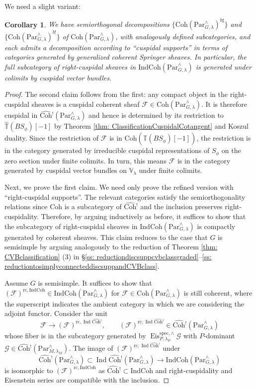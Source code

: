 \documentclass{amsart}
\newtheorem{corollary}[theorem]{Corollary}
\theoremstyle{definition}
\theoremstyle{remark}
\numberwithin{equation}{section}
\DeclareMathOperator{\Ind}{Ind}
\newcommand{\mc}{\mathcal}
\newcommand{\spec}{\mathrm{spec}}
\newcommand{\wh}{\widehat}
\newcommand{\Par}{\mathrm{Par}}
\newcommand{\IndCoh}{\mathrm{IndCoh}}
\DeclareMathOperator{\Eis}{\mathrm{Eis}}
\newcommand{\Coh}{\mathrm{Coh}}
\newcommand{\rc}{\mathrm{rc}}
\newcommand{\V}{\mathbb{V}}
\newcommand{\T}{\mathbb{T}}
\begin{document}
We need a slight variant:

\begin{corollary}\label{cor: CohCompletionSOD}
We have semiorthogonal decompositions $\{\Coh(\Par_{G,\lambda}^{\wedge})^{b\sharp}\}$ and $\{\Coh(\Par_{G,\lambda}^{\wedge})^{b!}\}$ of $\Coh(\Par_{G,\lambda}^{\wedge})$, with analogously defined subcategories, and each admits a decomposition according to ``cuspidal supports'' in terms of categories generated by generalized coherent Springer sheaves. In particular, the full subcategory of right-cuspidal sheaves in $\IndCoh(\Par_{G,\lambda}^{\wedge})$ is generated under colimits by cuspidal vector bundles.  
\end{corollary}

\begin{proof}
The second claim follows from the first: any compact object in the right-cuspidal sheaves is a cuspidal coherent sheaf $\mc F\in \Coh(\Par_{G,\lambda}^{\wedge})$. It is therefore cuspidal in $\wh{\Coh}{}^!(\Par_{G,\lambda}^{\wedge})$ and hence is determined by its restriction to $\wh{\T}(BS_\phi)[-1]$ by Theorem \ref{thm: ClassificationCuspidalCotangent} and Koszul duality. Since the restriction of $\mc F$ is in $\Coh(\wh{\T}(BS_\phi)[-1])$, the restriction is in the category generated by irreducible cuspidal representations of $S_\phi$ on the zero section under finite colimits. In turn, this means $\mc F$ is in the category generated by cuspidal vector bundles on $\V_\lambda$ under finite colimits. 

Next, we prove the first claim. We need only prove the refined version with ``right-cuspidal supports''. The relevant categories satisfy the semiorthogonality relations since $\Coh$ is a subcategory of $\wh{\Coh}{}^!$ and the inclusion preserves right-cuspidality. Therefore, by arguing inductively as before, it suffices to show that the subcategory of right-cuspidal sheaves in $\IndCoh(\Par_{G,\lambda}^\wedge)$ is compactly generated by coherent sheaves. This claim reduces to the case that $G$ is semisimple by arguing analogously to the reduction of Theorem \ref{thm: CVBclassification} (3) in \S \ref{ss: reductiondiscsuppcvbclassgraded}--\ref{ss: reductiontosimplyconnecteddiscsuppandCVBclass}. 

Assume $G$ is semisimple. It suffices to show that $(\mc F)^{\rc,\IndCoh}\in \IndCoh(\Par_{G,\lambda}^\wedge)$ for $\mc F\in \Coh(\Par_{G,\lambda}^\wedge)$ is still coherent, where the superscript indicates the ambient category in which we are considering the adjoint functor. Consider the unit
\[
\mc{F} \rightarrow (\mc F)^{\rc, \Ind\wh{\Coh}{}^!}, \qquad (\mc F)^{\rc, \Ind\wh{\Coh}{}^!}\in \wh{\Coh}{}^!(\Par^\wedge_{G,\lambda})
\] 
whose fiber is in the subcategory generated by $\Eis_{P,\lambda_P}^{\spec, \wedge} \mc G$ with $P$-dominant $\mc G \in \wh{\Coh}{}^!(\Par_{M,\lambda_M}^\wedge)$. 
The image of $(\mc F)^{\rc, \Ind\wh{\Coh}{}^!}$ under
\[
\wh{\Coh}{}^!(\Par_{G,\lambda}^\wedge)\subset \Ind\wh{\Coh}{}^!(\Par_{G,\lambda}^\wedge) \to \IndCoh (\Par_{G,\lambda}^\wedge)
\]
is isomorphic to $(\mc F)^{\rc, \IndCoh}$ as $\wh{\Coh}{}^!\subset \IndCoh$ and right-cuspidality and Eisenstein series are compatible with the inclusion. 


\end{proof}
\end{document}

